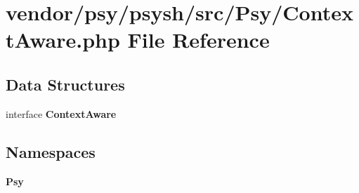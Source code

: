 \section{vendor/psy/psysh/src/\+Psy/\+Context\+Aware.php File Reference}
\label{_context_aware_8php}
\subsection*{Data Structures}
\begin{DoxyCompactItemize}
\item 
interface {\bf Context\+Aware}
\end{DoxyCompactItemize}
\subsection*{Namespaces}
\begin{DoxyCompactItemize}
\item 
 {\bf Psy}
\end{DoxyCompactItemize}
